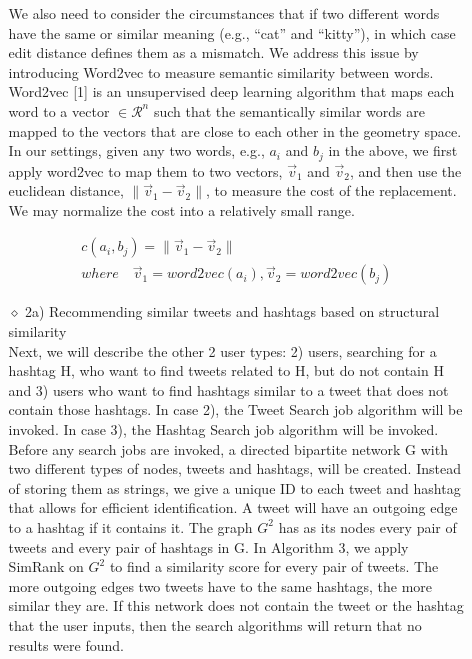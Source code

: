 \documentclass[10pt]{article}
\begin{document}
\begin{itemize}
\begin{itemize}
We also need to consider the circumstances that if two different words have the same or similar meaning (e.g., “cat” and “kitty”), in which case edit distance defines them as a mismatch. We address this issue by introducing Word2vec to measure semantic similarity between words. 
Word2vec [1] is an unsupervised  deep learning algorithm that maps each word to a vector  $\in \mathcal{R}^n$ such that the semantically similar words are mapped to the vectors that are close to each other in the geometry space. 
In our settings, given any two words, e.g.,  $a_i$ and $b_j$ in the above, we first apply word2vec to map them to two vectors, $\vec{v}_1$ and $\vec{v}_2$, and then use the euclidean distance, $\lVert \vec{v}_1 - \vec{v}_2 \rVert$, to measure the cost of the replacement.
We may normalize the cost into a relatively small range. 

$$
\begin{array}{c}
c(a_i, b_j)=\lVert \vec{v}_1 - \vec{v}_2 \rVert \\
 where \quad  \vec{v}_1 = word2vec(a_i), \vec{v}_2=word2vec(b_j)
\end{array}
$$

\item[$\diamond$]{2a) Recommending similar tweets and hashtags based on structural similarity}\\

Next, we will describe the other 2 user types: 2) users, searching for a hashtag H, who want to find tweets related to H, but do not contain H and 3) users who want to find hashtags similar to a tweet that does not contain those hashtags. In case 2), the Tweet Search job algorithm will be invoked. In case 3), the Hashtag Search job algorithm will be invoked. \\

Before any search jobs are invoked, a directed bipartite network G with two different types of nodes, tweets and hashtags, will be created. Instead of storing them as strings, we give a unique ID to each tweet and hashtag that allows for efficient identification. A tweet will have an outgoing edge to a hashtag if it contains it. The graph $ G^2$ has as its nodes every pair of tweets and every pair of hashtags in G. In Algorithm 3, we apply SimRank on $ G^2$  to find a similarity score for every pair of tweets. The more outgoing edges two tweets have to the same hashtags, the more similar they are. If this network does not contain the tweet or the hashtag that the user inputs, then the search algorithms will return that no results were found. \\


\end{itemize}
\end{itemize}
\end{document}
